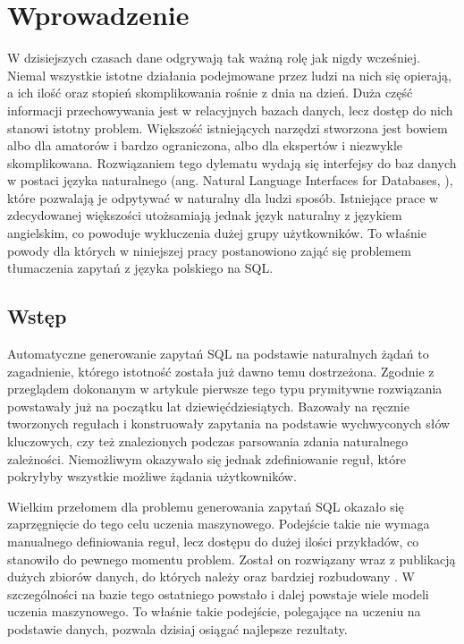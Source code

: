 \chapter{Wprowadzenie}
W dzisiejszych czasach dane odgrywają tak ważną rolę jak nigdy wcześniej.  Niemal wszystkie istotne działania podejmowane przez ludzi na nich się opierają, a ich ilość oraz stopień skomplikowania rośnie z dnia na dzień. Duża część informacji przechowywania jest w relacyjnych bazach danych, lecz dostęp do nich stanowi istotny problem. Większość istniejących narzędzi stworzona jest bowiem albo dla amatorów i bardzo ograniczona, albo dla ekspertów i niezwykle skomplikowana. Rozwiązaniem tego dylematu wydają się interfejsy do baz danych w postaci języka naturalnego (ang. Natural Language Interfaces for Databases, ), które pozwalają je odpytywać w naturalny dla ludzi sposób. Istniejące prace w zdecydowanej większości utożsamiają jednak język naturalny z językiem angielskim, co powoduje wykluczenia dużej grupy użytkowników. To właśnie powody dla których w niniejszej pracy postanowiono zająć się problemem tłumaczenia zapytań z języka polskiego na SQL. 

\section{Wstęp}
Automatyczne generowanie zapytań SQL na podstawie naturalnych żądań to zagadnienie, którego istotność została już dawno temu dostrzeżona. Zgodnie z przeglądem dokonanym w artykule   pierwsze tego typu prymitywne rozwiązania powstawały już na początku lat dziewięćdziesiątych. Bazowały na ręcznie tworzonych regułach i konstruowały zapytania na podstawie wychwyconych słów kluczowych, czy też znalezionych podczas parsowania zdania naturalnego zależności. Niemożliwym okazywało się jednak zdefiniowanie reguł, które pokryłyby wszystkie możliwe żądania użytkowników.

Wielkim przełomem dla problemu generowania zapytań SQL okazało się zaprzęgnięcie do tego celu uczenia maszynowego. Podejście takie nie wymaga manualnego definiowania reguł, lecz dostępu do dużej ilości przykładów, co stanowiło do pewnego momentu problem. Został on rozwiązany wraz z publikacją dużych zbiorów danych, do których należy   oraz bardziej rozbudowany  . W szczególności na bazie tego ostatniego powstało i dalej powstaje wiele modeli uczenia maszynowego. To właśnie takie podejście, polegające na uczeniu na podstawie danych, pozwala dzisiaj osiągać najlepsze rezultaty.

